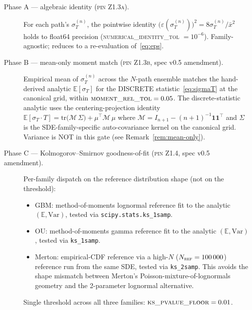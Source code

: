\documentclass[11pt,letterpaper]{article}
\newcommand{\E}{\mathbb{E}}
\newcommand{\Var}{\text{Var}}
\newcommand{\sigmaT}{\sigma_{T}}
\newcommand{\xbar}{\bar{x}}
\newcommand{\centerProj}{\mathcal{M}}
\newcommand{\PinZ}[1]{\textsc{pin Z1.#1}}
\begin{document}
\begin{description}
    \item[Phase A — algebraic identity (\PinZ{3a}).] For each path's
        $\sigmaT^{(n)}$, the pointwise identity
        $\bigl(\varepsilon(\sigmaT^{(n)})\bigr)^{2} = 8\sigmaT^{(n)} / \xbar^{2}$
        holds to float64 precision (\textsc{numerical\_identity\_tol} $= 10^{-6}$).
        Family-agnostic; reduces to a re-evaluation of~\eqref{eq:eps}.

    \item[Phase B — mean-only moment match (\PinZ{3b}, spec v0.5 amendment).]
        Empirical mean of $\sigmaT^{(n)}$ across the $N$-path ensemble
        matches the hand-derived analytic $\E[\sigmaT]$ for the
        DISCRETE statistic~\eqref{eq:sigmaT} at the canonical grid,
        within $\textsc{moment\_rel\_tol} = 0.05$. The discrete-statistic
        analytic uses the centering-projection identity
        \(
            \E[\sigmaT \cdot T] = \mathrm{tr}\bigl(\centerProj\,\Sigma\bigr)
                                  + \mu^{\top} \centerProj\, \mu
        \)
        where $\centerProj = I_{n+1} - (n+1)^{-1}\mathbf{1}\mathbf{1}^{\top}$
        and $\Sigma$ is the SDE-family-specific auto-covariance kernel
        on the canonical grid. Variance is NOT in this gate (see
        Remark~\ref{rem:mean-only}).

    \item[Phase C — Kolmogorov--Smirnov goodness-of-fit (\PinZ{4},
        spec v0.5 amendment).] Per-family dispatch on the reference
        distribution shape (not on the threshold):
        \begin{itemize}
            \item GBM: method-of-moments lognormal reference fit to the
                analytic $(\E, \Var)$, tested via
                \texttt{scipy.stats.ks\_1samp}.
            \item OU: method-of-moments gamma reference fit to the
                analytic $(\E, \Var)$, tested via \texttt{ks\_1samp}.
            \item Merton: empirical-CDF reference via a high-$N$
                ($N_{\textsc{ref}} = 100\,000$) reference run from the
                same SDE, tested via \texttt{ks\_2samp}. This avoids the
                shape mismatch between Merton's Poisson-mixture-of-lognormals
                geometry and the 2-parameter lognormal alternative.
        \end{itemize}
        Single threshold across all three families:
        $\textsc{ks\_pvalue\_floor} = 0.01$.
\end{description}
\end{document}
